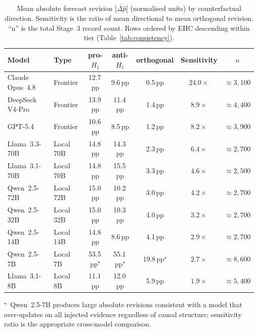 \documentclass{article} %
\begin{document}
\begin{table}[h]
\centering
\caption{Mean absolute forecast revision $\overline{|\Delta\hat{p}|}$ (normalised units)
by counterfactual direction.  Sensitivity is the ratio of mean directional to mean
orthogonal revision.  ``n'' is the total Stage~3 record count.  Rows ordered by EHC
descending within tier (Table~\ref{tab:consistency}).}
\label{tab:anchoring}
\small
\begin{tabular}{llccccc}
\toprule
\textbf{Model} & \textbf{Type} & pro-$H_1$ & anti-$H_1$ & orthogonal
  & \textbf{Sensitivity} & $n$ \\
\midrule
Claude Opus~4.8 & Frontier  & 12.7\,pp & 9.6\,pp  & 0.5\,pp & $24.0\times$ & ${\approx}3{,}100$ \\
DeepSeek V4-Pro & Frontier  & 13.9\,pp & 11.4\,pp & 1.4\,pp & $8.9\times$  & ${\approx}4{,}400$ \\
GPT-5.4         & Frontier  & 10.6\,pp & 8.5\,pp  & 1.2\,pp & $8.2\times$  & ${\approx}3{,}900$ \\
\midrule
Llama~3.3-70B   & Local 70B & 14.8\,pp & 14.3\,pp & 2.3\,pp & $6.4\times$  & ${\approx}2{,}700$ \\
Llama~3.1-70B   & Local 70B & 14.8\,pp & 15.5\,pp & 3.3\,pp & $4.6\times$  & ${\approx}2{,}500$ \\
Qwen~2.5-72B    & Local 72B & 15.0\,pp & 10.2\,pp & 3.0\,pp & $4.2\times$  & ${\approx}2{,}700$ \\
Qwen~2.5-32B    & Local 32B & 15.0\,pp & 10.3\,pp & 4.0\,pp & $3.2\times$  & ${\approx}2{,}700$ \\
Qwen~2.5-14B    & Local 14B & 14.8\,pp &  8.6\,pp & 4.1\,pp & $2.9\times$  & ${\approx}2{,}700$ \\
Qwen~2.5-7B     & Local 7B  & 53.5\,pp$^\star$ & 55.1\,pp$^\star$ & 19.8\,pp$^\star$ & $2.7\times$ & ${\approx}8{,}600$ \\
Llama~3.1-8B    & Local 8B  & 11.1\,pp & 12.0\,pp & 5.9\,pp & $1.9\times$  & ${\approx}5{,}400$ \\
\bottomrule
\end{tabular}
\end{table}
$^\star$~Qwen~2.5-7B produces large absolute revisions consistent with a model that
over-updates on all injected evidence regardless of causal structure; sensitivity ratio
is the appropriate cross-model comparison.
\end{document}
